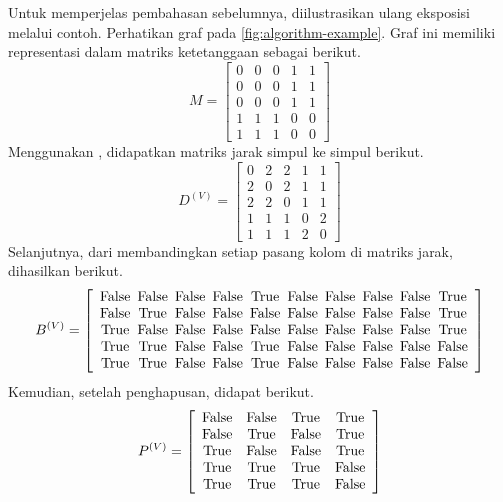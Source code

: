 Untuk memperjelas pembahasan sebelumnya, diilustrasikan ulang eksposisi melalui contoh. Perhatikan graf pada \autoref{fig:algorithm-example}. Graf ini memiliki representasi dalam matriks ketetanggaan sebagai berikut.
\[
	M = \left[ \begin{array}{ccccc}
		0 & 0 & 0 & 1 & 1 \\
		0 & 0 & 0 & 1 & 1 \\
		0 & 0 & 0 & 1 & 1 \\
		1 & 1 & 1 & 0 & 0 \\
		1 & 1 & 1 & 0 & 0
	\end{array} \right]
\]
Menggunakan , didapatkan matriks jarak simpul ke simpul berikut.
\[
	D^{(V)} = \left[ \begin{array}{ccccc}
		0 & 2 & 2 & 1 & 1 \\
		2 & 0 & 2 & 1 & 1 \\
		2 & 2 & 0 & 1 & 1 \\
		1 & 1 & 1 & 0 & 2 \\
		1 & 1 & 1 & 2 & 0
	\end{array} \right]
\]
Selanjutnya, dari membandingkan setiap pasang kolom di matriks jarak, dihasilkan  berikut.
\[
	B^{(V)} = \left[ \begin{array}{c@{\enspace}c@{\enspace}c@{\enspace}c@{\enspace}c@{\enspace}c@{\enspace}c@{\enspace}c@{\enspace}c@{\enspace}c@{\enspace}}
		\False & \False & \False & \False &  \True & \False & \False & \False & \False &  \True \\
		\False &  \True & \False & \False & \False & \False & \False & \False & \False &  \True \\
		 \True & \False & \False & \False & \False & \False & \False & \False & \False &  \True \\
		 \True &  \True & \False & \False &  \True & \False & \False & \False & \False & \False \\
		 \True &  \True & \False & \False &  \True & \False & \False & \False & \False & \False
	\end{array} \right]
\]
Kemudian, setelah penghapusan, didapat  berikut.
\[
	P^{(V)} = \left[ \begin{array}{ccccc}
		\mathrm{False} & \mathrm{False} &  \mathrm{True} &  \mathrm{True} \\
		\mathrm{False} &  \mathrm{True} & \mathrm{False} &  \mathrm{True} \\
		 \mathrm{True} & \mathrm{False} & \mathrm{False} &  \mathrm{True} \\
		 \mathrm{True} &  \mathrm{True} &  \mathrm{True} & \mathrm{False} \\
		 \mathrm{True} &  \mathrm{True} &  \mathrm{True} & \mathrm{False} \\
	\end{array} \right]
\] \\
